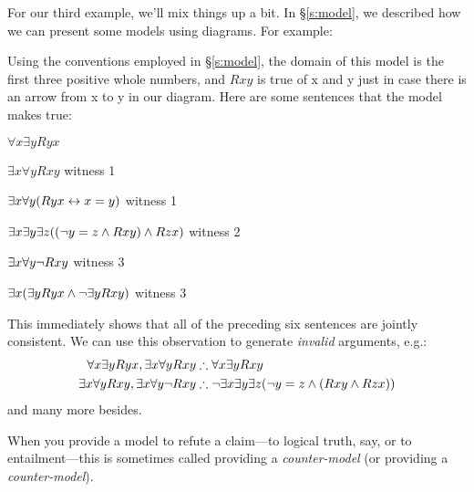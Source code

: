 For our third example, we'll mix things up a bit. In \S\ref{s:model}, we described how we can present some models using diagrams. For example:
\begin{center}
\end{center}
Using the conventions employed in \S\ref{s:model}, the domain of this model is the first three positive whole numbers, and $Rxy$ is true of x and y just in case there is an arrow from x to y in our diagram. Here are some sentences that the model makes true:
	\begin{ebullet}
		\item $\forall x \exists y Ryx$
		\item $\exists x \forall y Rxy$ \hfill witness 1
		\item $\exists x \forall y (Ryx \leftrightarrow x = y)$ \hfill witness 1
		\item $\exists x \exists y \exists z ((\neg y = z \mathbin{\wedge} Rxy) \mathbin{\wedge} Rzx)$ \hfill witness 2
		\item $\exists x \forall y \neg Rxy$ \hfill witness 3
		\item $\exists x (\exists y Ryx \mathbin{\wedge} \neg \exists y Rxy)$ \hfill witness 3
	\end{ebullet}
This immediately shows that all of the preceding six sentences are jointly consistent. We can use this observation to generate \emph{invalid} arguments, e.g.:
	\begin{align*}
		\forall x \exists y Ryx, \exists x \forall y Rxy  &\therefore  \forall x \exists y Rxy\\
		\exists x \forall y Rxy, \exists x \forall y \enot Rxy & \therefore \enot \exists x \exists y \exists z (\enot y = z \eand (Rxy \eand Rzx))
	\end{align*}
and many more besides.

When you provide a model to refute a claim---to logical truth, say, or to entailment---this is sometimes called providing a \emph{counter-model} (or providing a \emph{counter-model}).

